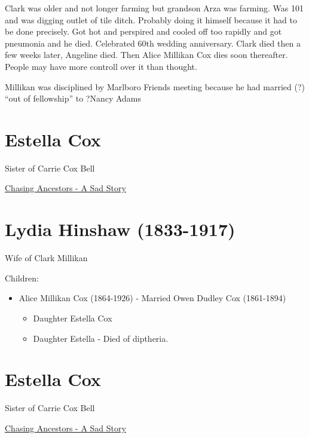 \documentclass[
]{book}
\providecommand{\tightlist}{%
  \setlength{\itemsep}{0pt}\setlength{\parskip}{0pt}}
\begin{document}
Clark was older and not longer farming but grandson Arza was farming. Was 101 and was digging outlet of tile ditch. Probably doing it himself because it had to be done precisely. Got hot and perspired and cooled off too rapidly and got pneumonia and he died. Celebrated 60th wedding anniversary. Clark died then a few weeks later, Angeline died. Then Alice Millikan Cox dies soon thereafter. People may have more controll over it than thought.

Millikan was disciplined by Marlboro Friends meeting because he had married (?) ``out of fellowship'' to ?Nancy Adams

\hypertarget{estella-cox}{%
\chapter{Estella Cox}\label{estella-cox}}

Sister of Carrie Cox Bell

\href{https://chasingancestors.com/2017/03/20/a-sad-story/}{Chasing Ancestors - A Sad Story}

\hypertarget{lydia-hinshaw-1833-1917}{%
\chapter{Lydia Hinshaw (1833-1917)}\label{lydia-hinshaw-1833-1917}}

Wife of Clark Millikan

Children:

\begin{itemize}
\item
  Alice Millikan Cox (1864-1926) - Married Owen Dudley Cox (1861-1894)

  \begin{itemize}
  \tightlist
  \item
    Daughter Estella Cox
  \item
    Daughter Estella - Died of diptheria.
  \end{itemize}
\end{itemize}

\hypertarget{estella-cox-1}{%
\chapter{Estella Cox}\label{estella-cox-1}}

Sister of Carrie Cox Bell

\href{https://chasingancestors.com/2017/03/20/a-sad-story/}{Chasing Ancestors - A Sad Story}
\end{document}
